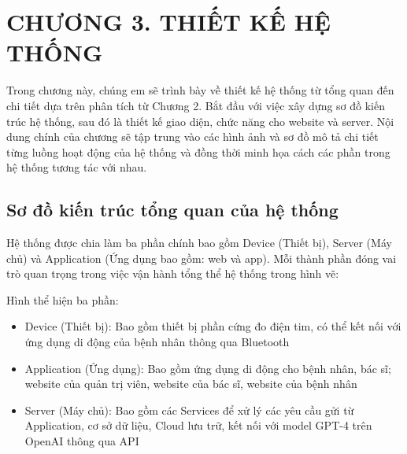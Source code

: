 
\section*{CHƯƠNG 3. THIẾT KẾ HỆ THỐNG}
\setcounter{section}{3}
\setcounter{subsection}{0} %
\setcounter{table}{0} %
\setcounter{figure}{0} %

Trong chương này, chúng em sẽ trình bày về thiết kế hệ thống từ tổng quan đến chi tiết dựa trên phân tích từ Chương 2. Bắt đầu với việc xây dựng sơ đồ kiến trúc hệ thống,
sau đó là thiết kế giao diện, chức năng cho website và server. Nội dung chính của chương sẽ tập trung vào các hình
ảnh và sơ đồ mô tả chi tiết từng luồng hoạt động của hệ thống và đồng thời minh họa cách các phần trong hệ thống tương tác với nhau.

\subsection{Sơ đồ kiến trúc tổng quan của hệ thống}
Hệ thống được chia làm ba phần chính bao gồm Device (Thiết bị), Server (Máy chủ) và Application (Ứng dụng bao gồm: web và app). Mỗi thành phần đóng vai trò quan trọng trong việc vận hành tổng thể hệ thống trong hình vẽ:


Hình  thể hiện ba phần: 

\begin{adjustwidth}{1.5em}{}
\begin{itemize}
  \item Device (Thiết bị): Bao gồm thiết bị phần cứng đo điện tim, có thể kết nối với ứng dụng di động của bệnh nhân thông qua Bluetooth 
  \item Application (Ứng dụng): Bao gồm ứng dụng di động cho bệnh nhân, bác sĩ; website của quản trị viên, website của bác sĩ, website của bệnh nhân
  \item Server (Máy chủ): Bao gồm các Services để xử lý các yêu cầu gửi từ Application, cơ sở dữ liệu, Cloud lưu trữ, kết nối với model GPT-4 trên OpenAI thông qua API
\end{itemize}
\end{adjustwidth}

